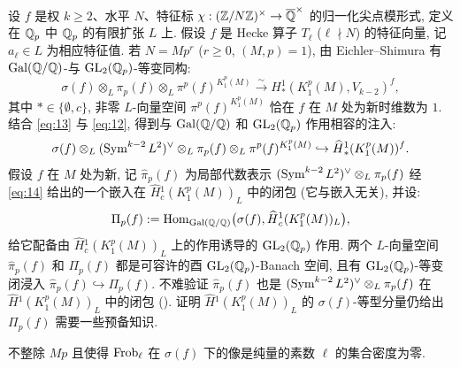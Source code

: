 设 $f$ 是权 $k \ge 2$、水平 $N$、特征标 $\chi : (\mathbb{Z}/N\mathbb{Z})^{\times} \to \overline{\mathbb{Q}}^{\times}$ 的归一化尖点模形式, 定义在 $\mathbb{Q}_p$ 中 $\mathbb{Q}_p$ 的有限扩张 $L$ 上.
假设 $f$ 是 Hecke 算子 $T_{\ell}$ ($\ell \nmid N$) 的特征向量, 记 $a_{\ell} \in L$ 为相应特征值.
若 $N = Mp^{r}$ ($r \ge 0$, $(M,p) = 1$), 由 Eichler--Shimura 有 $\operatorname{Gal}(\mathbb{Q}/\mathbb{Q})$-与 $\mathrm{GL}_2(\mathbb{Q}_p)$-等变同构:
\begin{equation}
\label{eq:13}
\sigma(f) \otimes_L \pi_p(f) \otimes_L \pi^{p}(f)^{K_1^{p}(M)} \xrightarrow{\sim} H_{*}^{1}(K_1^{p}(M),V_{k-2})^{f},
\end{equation}
其中 $* \in \{\emptyset,c\}$, 非零 $L$-向量空间 $\pi^{p}(f)^{K_1^{p}(M)}$ 恰在 $f$ 在 $M$ 处为新时维数为 $1$.
结合 \eqref{eq:13} 与 \eqref{eq:12}, 得到与 $\operatorname{Gal}(\mathbb{Q}/\mathbb{Q})$ 和 $\mathrm{GL}_2(\mathbb{Q}_p)$ 作用相容的注入:
\begin{equation}
\label{eq:14}
\sigma(f) \otimes_L (\operatorname{Sym}^{k-2}L^{2})^{\vee} \otimes_L \pi_p(f) \otimes_L \pi^{p}(f)^{K_1^{p}(M)} \hookrightarrow \widehat{H}{}_{*}^{1}(K_1^{p}(M))^{f}.
\end{equation}
假设 $f$ 在 $M$ 处为新, 记 $\widehat{\pi}_p(f)$ 为局部代数表示 $(\operatorname{Sym}^{k-2}L^{2})^{\vee} \otimes_L \pi_p(f)$ 经 \eqref{eq:14} 给出的一个嵌入在 $\widehat{H}{}_{c}^{1}(K_1^{p}(M))_L$ 中的闭包 (它与嵌入无关), 并设:
\[
\Pi_p(f) := \operatorname{Hom}_{\operatorname{Gal}(\mathbb{Q}/\mathbb{Q})}\bigl(\sigma(f),\widehat{H}{}_{c}^{1}(K_1^{p}(M))_L\bigr),
\]
给它配备由 $\widehat{H}{}_{c}^{1}(K_1^{p}(M))_L$ 上的作用诱导的 $\mathrm{GL}_2(\mathbb{Q}_p)$ 作用.
两个 $L$-向量空间 $\widehat{\pi}_p(f)$ 和 $\Pi_p(f)$ 都是可容许的酉 $\mathrm{GL}_2(\mathbb{Q}_p)$-Banach 空间, 且有 $\mathrm{GL}_2(\mathbb{Q}_p)$-等变闭浸入 $\widehat{\pi}_p(f) \hookrightarrow \Pi_p(f)$.
不难验证 $\widehat{\pi}_p(f)$ 也是 $(\operatorname{Sym}^{k-2}L^{2})^{\vee} \otimes_L \pi_p(f)$ 在 $\widehat{H}{}^{1}(K_1^{p}(M))_L$ 中的闭包 (\cite[Prop.~2.2.3]{ref:9}).
证明 $\widehat{H}{}^{1}(K_1^{p}(M))_L$ 的 $\sigma(f)$-等型分量仍给出 $\Pi_p(f)$ 需要一些预备知识.

\begin{lemma}\label{lem:3.2.1}
不整除 $Mp$ 且使得 $\operatorname{Frob}_{\ell}$ 在 $\sigma(f)$ 下的像是纯量的素数 $\ell$ 的集合密度为零.
\end{lemma}

